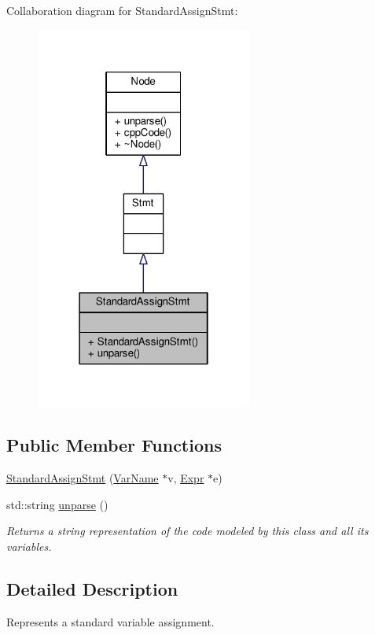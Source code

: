 Collaboration diagram for Standard\-Assign\-Stmt\-:\nopagebreak
\begin{figure}[H]
\begin{center}
\leavevmode
\includegraphics[width=202pt]{classStandardAssignStmt__coll__graph}
\end{center}
\end{figure}
\subsection*{Public Member Functions}
\begin{DoxyCompactItemize}
\item 
\hyperlink{classStandardAssignStmt_aa0d2dac7f07be33118c436f526f9fb1d}{Standard\-Assign\-Stmt} (\hyperlink{classVarName}{Var\-Name} $\ast$v, \hyperlink{classExpr}{Expr} $\ast$e)
\item 
std\-::string \hyperlink{classStandardAssignStmt_aa4bef62d90b49a7ed4c5120cb656ba0e}{unparse} ()
\begin{DoxyCompactList}\small\item\em Returns a string representation of the code modeled by this class and all its variables. \end{DoxyCompactList}\end{DoxyCompactItemize}


\subsection{Detailed Description}
Represents a standard variable assignment. \par
 

